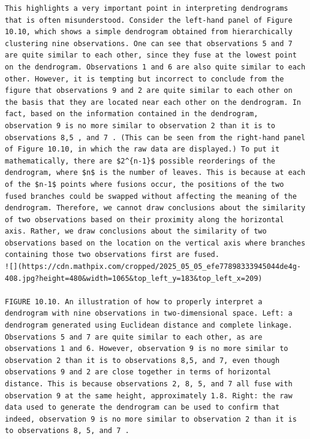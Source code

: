 \documentclass[10pt]{article}
\begin{document}
\begin{verbatim}
This highlights a very important point in interpreting dendrograms that is often misunderstood. Consider the left-hand panel of Figure 10.10, which shows a simple dendrogram obtained from hierarchically clustering nine observations. One can see that observations 5 and 7 are quite similar to each other, since they fuse at the lowest point on the dendrogram. Observations 1 and 6 are also quite similar to each other. However, it is tempting but incorrect to conclude from the figure that observations 9 and 2 are quite similar to each other on the basis that they are located near each other on the dendrogram. In fact, based on the information contained in the dendrogram, observation 9 is no more similar to observation 2 than it is to observations 8,5 , and 7 . (This can be seen from the right-hand panel of Figure 10.10, in which the raw data are displayed.) To put it mathematically, there are $2^{n-1}$ possible reorderings of the dendrogram, where $n$ is the number of leaves. This is because at each of the $n-1$ points where fusions occur, the positions of the two fused branches could be swapped without affecting the meaning of the dendrogram. Therefore, we cannot draw conclusions about the similarity of two observations based on their proximity along the horizontal axis. Rather, we draw conclusions about the similarity of two observations based on the location on the vertical axis where branches containing those two observations first are fused.
![](https://cdn.mathpix.com/cropped/2025_05_05_efe77898333945044de4g-408.jpg?height=480&width=1065&top_left_y=183&top_left_x=209)

FIGURE 10.10. An illustration of how to properly interpret a dendrogram with nine observations in two-dimensional space. Left: a dendrogram generated using Euclidean distance and complete linkage. Observations 5 and 7 are quite similar to each other, as are observations 1 and 6. However, observation 9 is no more similar to observation 2 than it is to observations 8,5, and 7, even though observations 9 and 2 are close together in terms of horizontal distance. This is because observations 2, 8, 5, and 7 all fuse with observation 9 at the same height, approximately 1.8. Right: the raw data used to generate the dendrogram can be used to confirm that indeed, observation 9 is no more similar to observation 2 than it is to observations 8, 5, and 7 .


\end{verbatim}
\end{document}

